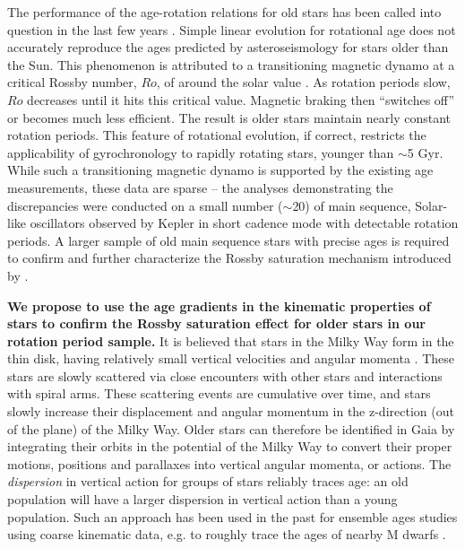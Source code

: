 \documentclass[12pt]{article}
\newcommand{\eg}{{\it e.g.}}
\begin{document}
The performance of the age-rotation relations for old
stars has been called into question in the last few years
\citep{angus2015,van-saders2016, Metcalfe2016}.
Simple linear evolution for rotational age does not accurately reproduce the ages
predicted by asteroseismology for stars older than the Sun.
This phenomenon is attributed to a transitioning magnetic dynamo at a critical
Rossby number, $Ro$, of around the solar value \citep{van-saders2016}.
As rotation periods slow, $Ro$ decreases until it hits this critical value. Magnetic braking then ``switches off'' or becomes much less efficient. The result is older stars maintain nearly constant rotation periods. This feature of rotational evolution, if correct, restricts the applicability
of gyrochronology to rapidly rotating stars, younger than $\sim$5 Gyr.
While such a transitioning magnetic dynamo is supported by the existing age
measurements,
these data are sparse -- the analyses demonstrating the discrepancies were
conducted on a small number ($\sim$20) of main sequence, Solar-like oscillators observed
by Kepler in short cadence mode with detectable rotation periods.
A larger sample of old main sequence stars with precise ages is required to
confirm and further characterize the Rossby saturation mechanism introduced by
\citep{van-saders2016}.

{\bf We propose to use the age gradients in the kinematic properties of stars to
confirm the Rossby saturation effect for older stars in our rotation period sample.}
It is believed that stars in the Milky Way form in the thin disk, having relatively small vertical velocities and angular momenta
\citep[\eg][]{carlberg1985, edvardsson1993, freeman2002, bensby2004,
holmberg2007}.
These stars are slowly scattered via close encounters with other stars and
interactions with spiral arms.
These scattering events are cumulative over time, and stars slowly
increase their displacement and angular momentum in the z-direction (out of the
plane) of the Milky Way.
Older stars can therefore be identified in Gaia by integrating their orbits in the
potential of the Milky Way to convert their proper motions, positions and
parallaxes into vertical angular momenta, or actions.
The {\it dispersion} in vertical action for groups of stars reliably traces
age: an old population will have a larger dispersion in vertical action than a
young population. Such an approach has been used in the past for ensemble ages studies using coarse kinematic data, e.g. to roughly trace the ages of nearby M dwarfs \citep{bochanski_gal}.
\end{document}
